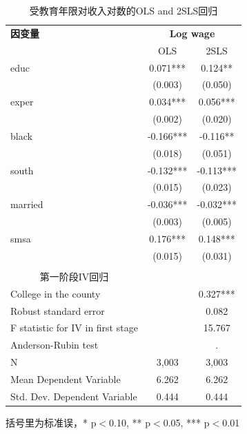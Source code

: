 \documentclass[cn,12pt,math=newtx,citestyle=gb7714-2015,bibstyle=gb7714-2015]{elegantbook}
\begin{document}
	\begin{table}[htbp]\centering
		\scriptsize
		\caption{受教育年限对收入对数的OLS and 2SLS回归}
		\label{2sls_1}
		\begin{center}
			\begin{threeparttable}
				\begin{tabular}{l*{2}{c}}
					\toprule
					\multicolumn{1}{l}{\textbf{因变量}}&
					\multicolumn{2}{c}{\textbf{Log wage}}\\
					\multicolumn{1}{c}{}&
					\multicolumn{1}{c}{OLS}&
					\multicolumn{1}{c}{2SLS}\\
					\midrule
					educ                &       0.071***&       0.124** \\
					&     (0.003)   &     (0.050)   \\
					exper               &       0.034***&       0.056***\\
					&     (0.002)   &     (0.020)   \\
					black               &      -0.166***&      -0.116** \\
					&     (0.018)   &     (0.051)   \\
					south               &      -0.132***&      -0.113***\\
					&     (0.015)   &     (0.023)   \\
					married             &      -0.036***&      -0.032***\\
					&     (0.003)   &     (0.005)   \\
					smsa                &       0.176***&       0.148***\\
					&     (0.015)   &     (0.031)   \\
					\\
					\midrule
					\multicolumn{1}{c}{第一阶段IV回归}\\
					College in the county&               &       0.327***\\
					Robust standard error &               &       0.082   \\
					F statistic for IV in first stage&               &      15.767   \\
					Anderson-Rubin test &               &           .   \\
					N                   &       3,003   &       3,003   \\
					Mean Dependent Variable&       6.262   &       6.262   \\
					Std. Dev. Dependent Variable&       0.444   &       0.444   \\
					\bottomrule
				\end{tabular}
				\begin{tablenotes}
					\tiny
					\item 括号里为标准误，* p$<$0.10, ** p$<$0.05, *** p$<$0.01
				\end{tablenotes}
			\end{threeparttable}
		\end{center}
	\end{table}
	
\end{document}
